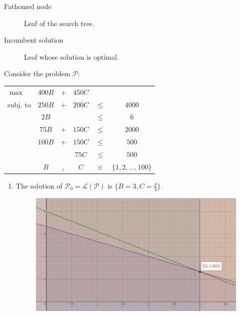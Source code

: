\begin{description}
    \item[Fathomed node] Leaf of the search tree.
    \item[Incumbent solution] Leaf whose solution is optimal.  
\end{description}

\begin{example}
    Consider the problem $\mathcal{P}$:
    \begin{center}
        \begin{tabular}{lccccc}
            $\max$ & $400B$ & $+$ & $450C$ \\
            subj. to & $250B$ & $+$ & $200C$ & $\leq$ & $4000$ \\
                     & $2B$ & & & $\leq$ & 6 \\
                     & $75B$ & $+$ & $150C$ & $\leq$ & $2000$ \\
                     & $100B$ & $+$ & $150C$ & $\leq$ & $500$ \\
                     & & & $75C$ & $\leq$ & $500$ \\
                     & $B$ & , & $C$ & $\in$ & $\{ 1, 2, \dots, 100\}$ \\
        \end{tabular}
    \end{center}

    \begin{enumerate}
        \item The solution of $\mathcal{P}_0 = \mathcal{L}(\mathcal{P})$ is $\{ B = 3, C = \frac{4}{3} \}$.
            \begin{figure}[H]
                \centering
                \includegraphics[width=0.55\linewidth]{./img/bakery_1.png}
            \end{figure}


\end{enumerate}
\end{example}
